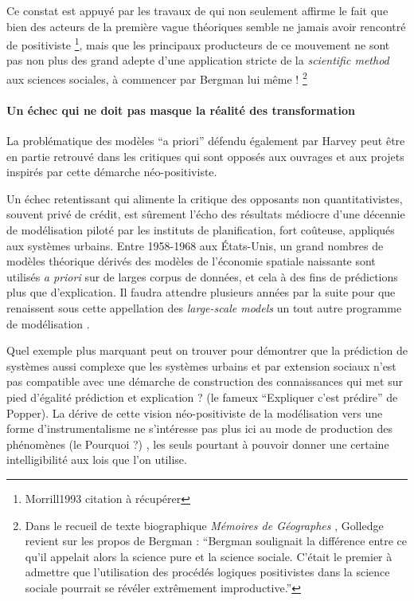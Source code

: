 Ce constat est appuyé par les travaux de \textcite{Barnes1996, Barnes2001a} qui non seulement affirme le fait que bien des acteurs de la première vague théoriques semble ne jamais avoir rencontré de positiviste \footnote{Morrill1993 citation à récupérer}, mais que les principaux producteurs de ce mouvement ne sont pas non plus des grand adepte d'une application stricte de la \textit{scientific method} aux sciences sociales, à commencer par Bergman lui même ! \footnote{Dans le recueil de texte biographique \textit{Mémoires de Géographes} \textcite[96]{Bailly2000}, Golledge revient sur les propos de Bergman : \enquote{Bergman soulignait la différence entre ce qu'il appelait alors la science pure et la science sociale. C'était le premier à admettre que l'utilisation des procédés logiques positivistes dans la science sociale pourrait se révéler extrêmement improductive.} } 

\paragraph{Un échec qui ne doit pas masque la réalité des transformation}

La problématique des modèles \enquote{a priori} défendu également par Harvey peut être en partie retrouvé dans les critiques qui sont opposés aux ouvrages et aux projets inspirés par cette démarche néo-positiviste.

Un échec retentissant qui alimente la critique des opposants non quantitativistes, souvent privé de crédit, est sûrement l'écho \autocite{Lee1973} des résultats médiocre d'une décennie de modélisation piloté par les instituts de planification, fort coûteuse, appliqués aux systèmes urbains. Entre 1958-1968 aux États-Unis, un grand nombres de modèles théorique \autocite[7-9]{Batty1979} dérivés des modèles de l'économie spatiale naissante sont utilisés \textit{a priori} sur de larges corpus de données, et cela à des fins de prédictions plus que d'explication. Il faudra attendre plusieurs années par la suite pour que renaissent sous cette appellation des \textit{large-scale models} un tout autre programme de modélisation \autocite{Boyce1988}.

Quel exemple plus marquant peut on trouver pour démontrer que la prédiction de systèmes aussi complexe que les systèmes urbains et par extension sociaux n'est pas compatible avec une démarche de construction des connaissances qui met sur pied d'égalité prédiction et explication ? (le fameux \enquote{Expliquer c'est prédire} de Popper). La dérive de cette vision néo-positiviste de la modélisation vers une forme d'instrumentalisme ne s’intéresse pas plus ici au mode de production des phénomènes (le Pourquoi ?) \autocite[41]{Gregory1978}, les seuls pourtant à pouvoir donner une certaine intelligibilité aux lois que l'on utilise. \autocite[14-15]{Besse2000}

